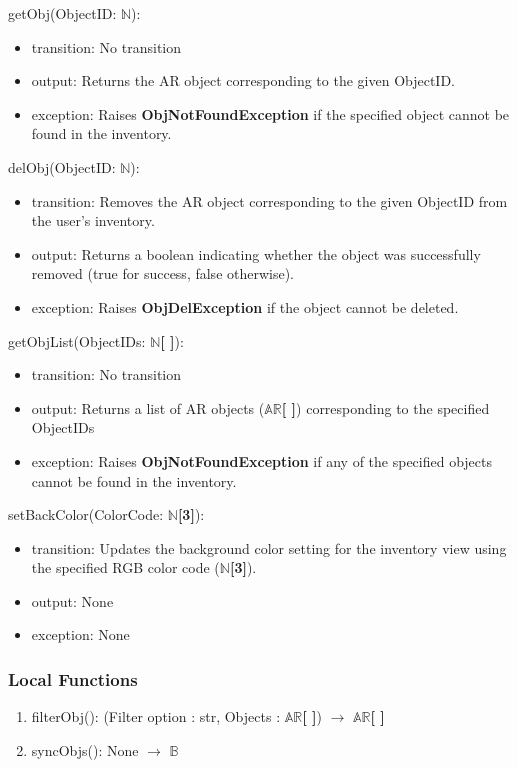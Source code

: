 \documentclass[12pt, titlepage]{article}
\begin{document}
\noindent getObj(ObjectID: $\mathbb{N}$):
\begin{itemize}
\item transition: No transition
\item output: Returns the AR object corresponding to the given ObjectID.
\item exception: Raises \textbf{ObjNotFoundException} if the specified object cannot be found in the inventory.
\end{itemize}

\noindent delObj(ObjectID: $\mathbb{N}$):
\begin{itemize}
\item transition:  Removes the AR object corresponding to the given ObjectID from the user's inventory.
\item output: Returns a boolean indicating whether the object was successfully removed (true for success, false otherwise).
\item exception: Raises \textbf{ObjDelException} if the object cannot be deleted.
\end{itemize}

\noindent getObjList(ObjectIDs: $\mathbb{N}$\textbf{[ ]}):
\begin{itemize}
\item transition: No transition
\item output: Returns a list of AR objects ($\mathbb{AR}$\textbf{[ ]}) corresponding to the specified ObjectIDs
\item exception: Raises \textbf{ObjNotFoundException} if any of the specified objects cannot be found in the inventory.
\end{itemize}

\noindent setBackColor(ColorCode: $\mathbb{N}$\textbf{[3]}):
\begin{itemize}
\item transition: Updates the background color setting for the inventory view using the specified RGB color code ($\mathbb{N}$\textbf{[3]}).
\item output: None
\item exception: None
\end{itemize}

\subsubsection{Local Functions}

\begin{enumerate}
  \item filterObj(): (Filter option : str, Objects : $\mathbb{AR}$\textbf{[ ]}) $\rightarrow$ $\mathbb{AR}$\textbf{[ ]}
  \item syncObjs(): None $\rightarrow$ $\mathbb{B}$
\end{enumerate}
\end{document}
